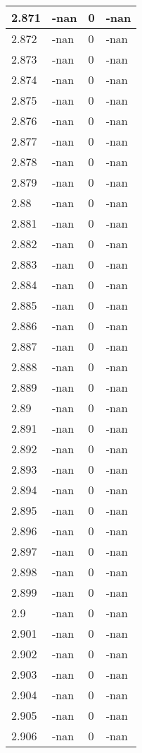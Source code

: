 \documentclass[a4paper,14pt]{extarticle}
\begin{document}
\begin{longtable}{||m{3cm}||m{3cm}|m{3cm}||m{3cm}||}
\hline
2.871 & -nan & 0 & -nan\\
\hline
2.872 & -nan & 0 & -nan\\
\hline
2.873 & -nan & 0 & -nan\\
\hline
2.874 & -nan & 0 & -nan\\
\hline
2.875 & -nan & 0 & -nan\\
\hline
2.876 & -nan & 0 & -nan\\
\hline
2.877 & -nan & 0 & -nan\\
\hline
2.878 & -nan & 0 & -nan\\
\hline
2.879 & -nan & 0 & -nan\\
\hline
2.88 & -nan & 0 & -nan\\
\hline
2.881 & -nan & 0 & -nan\\
\hline
2.882 & -nan & 0 & -nan\\
\hline
2.883 & -nan & 0 & -nan\\
\hline
2.884 & -nan & 0 & -nan\\
\hline
2.885 & -nan & 0 & -nan\\
\hline
2.886 & -nan & 0 & -nan\\
\hline
2.887 & -nan & 0 & -nan\\
\hline
2.888 & -nan & 0 & -nan\\
\hline
2.889 & -nan & 0 & -nan\\
\hline
2.89 & -nan & 0 & -nan\\
\hline
2.891 & -nan & 0 & -nan\\
\hline
2.892 & -nan & 0 & -nan\\
\hline
2.893 & -nan & 0 & -nan\\
\hline
2.894 & -nan & 0 & -nan\\
\hline
2.895 & -nan & 0 & -nan\\
\hline
2.896 & -nan & 0 & -nan\\
\hline
2.897 & -nan & 0 & -nan\\
\hline
2.898 & -nan & 0 & -nan\\
\hline
2.899 & -nan & 0 & -nan\\
\hline
2.9 & -nan & 0 & -nan\\
\hline
2.901 & -nan & 0 & -nan\\
\hline
2.902 & -nan & 0 & -nan\\
\hline
2.903 & -nan & 0 & -nan\\
\hline
2.904 & -nan & 0 & -nan\\
\hline
2.905 & -nan & 0 & -nan\\
\hline
2.906 & -nan & 0 & -nan\\

\end{longtable}
\end{document}
